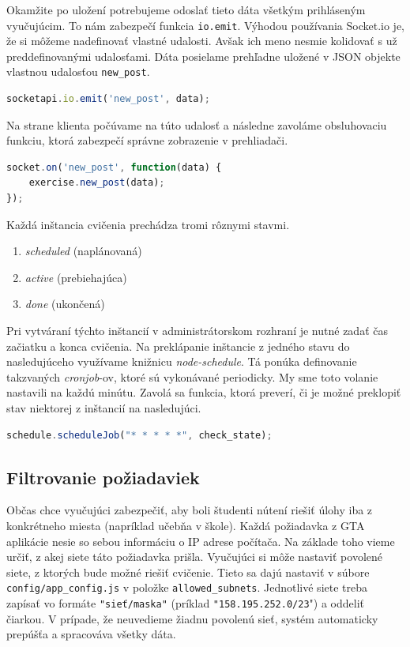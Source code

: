 Okamžite po uložení potrebujeme odoslať tieto dáta všetkým prihláseným vyučujúcim.
To nám zabezpečí funkcia \verb'io.emit'. Výhodou používania Socket.io je, že si môžeme
nadefinovať vlastné udalosti. Avšak ich meno nesmie kolidovať s už preddefinovanými
udalosťami. Dáta posielame prehľadne uložené v JSON objekte vlastnou udalosťou
\verb'new_post'.

\begin{lstlisting}[language=JavaScript]
socketapi.io.emit('new_post', data);
\end{lstlisting}

Na strane klienta počúvame na túto udalosť a následne zavoláme obsluhovaciu
funkciu, ktorá zabezpečí správne zobrazenie v prehliadači.

\begin{lstlisting}[language=JavaScript]
socket.on('new_post', function(data) {
    exercise.new_post(data);
});
\end{lstlisting}

Každá inštancia cvičenia prechádza tromi rôznymi stavmi.
\begin{enumerate}
	\item \textit{scheduled} (naplánovaná)
	\item \textit{active} (prebiehajúca)
	\item \textit{done} (ukončená)
\end{enumerate}

Pri vytváraní týchto inštancií v administrátorskom rozhraní je nutné zadať
čas začiatku a konca cvičenia. Na preklápanie inštancie z jedného stavu do nasledujúceho
využívame knižnicu \textit{node-schedule}. Tá ponúka definovanie takzvaných
\textit{cronjob}-ov, ktoré sú vykonávané periodicky. My sme toto volanie nastavili
na každú minútu. Zavolá sa funkcia, ktorá preverí, či je možné preklopiť stav
niektorej z inštancií na nasledujúci.

\begin{lstlisting}[language=JavaScript]
schedule.scheduleJob("* * * * *", check_state);
\end{lstlisting} 

\subsection{Filtrovanie požiadaviek}
\label{sec:gtadataprocessing:ipfilter}

Občas chce vyučujúci zabezpečiť, aby boli študenti nútení riešiť úlohy
iba z konkrétneho miesta (napríklad učebňa v škole). Každá požiadavka z GTA aplikácie
nesie so sebou informáciu o IP adrese počítača. Na základe toho vieme určiť,
z akej siete táto požiadavka prišla. Vyučujúci si môže nastaviť povolené siete,
z ktorých bude možné riešiť cvičenie. Tieto sa dajú nastaviť v súbore
\verb'config/app_config.js' v položke \verb'allowed_subnets'.
Jednotlivé siete treba zapísať vo formáte \verb'"sieť/maska"'
(príklad \verb'"158.195.252.0/23'") a oddeliť čiarkou.
V prípade, že neuvedieme žiadnu povolenú sieť, systém automaticky prepúšťa
a spracováva všetky dáta.

